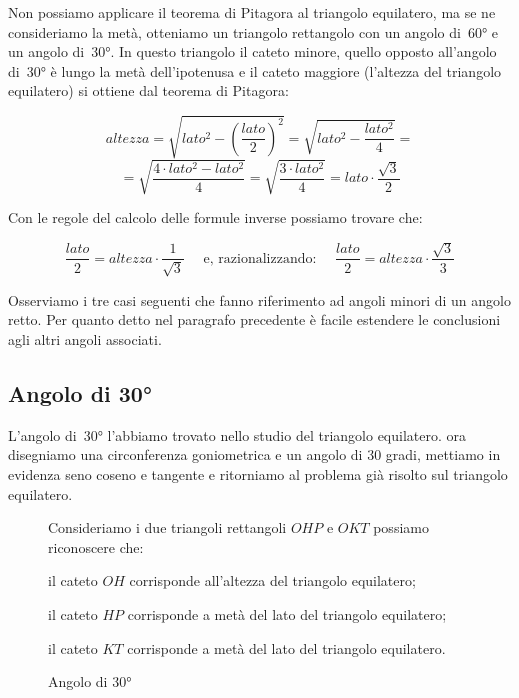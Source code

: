 Non possiamo applicare il teorema di Pitagora al triangolo equilatero, 
ma se ne consideriamo la metà, otteniamo un triangolo rettangolo con un angolo 
di~60° e un angolo di~30°. In questo triangolo il cateto minore, quello opposto 
all'angolo di~30° è lungo la metà dell'ipotenusa e il cateto maggiore 
(l'altezza del triangolo equilatero) si ottiene dal teorema di Pitagora:

\[altezza = \sqrt{lato^2 - \left (\frac{lato}{2} \right )^2} = 
            \sqrt{lato^2 - \frac{lato^2}{4}}= \]
\[          =\sqrt{\frac{4 \cdot lato^2 - lato^2}{4}}=
            \sqrt{\frac{3 \cdot lato^2}{4}}=
            lato \cdot \frac{\sqrt{3}}{2} \]

Con le regole del calcolo delle formule inverse possiamo trovare che:

\[\frac{lato}{2} = altezza \cdot \frac{1}{\sqrt{3}} \quad 
\text{ e, razionalizzando: } \quad 
  \frac{lato}{2} = altezza \cdot \frac{\sqrt{3}}{3}\]

Osserviamo i tre casi seguenti che fanno riferimento ad angoli minori di un
angolo retto. Per quanto detto nel paragrafo precedente è facile estendere le
conclusioni agli altri angoli associati.

\subsection{Angolo di 30°}

L'angolo di~30° l'abbiamo trovato nello studio del triangolo equilatero. ora 
disegniamo una circonferenza goniometrica e un angolo di 30 gradi, mettiamo in 
evidenza seno coseno e tangente e ritorniamo al problema già risolto sul 
triangolo equilatero.

 \begin{figure}[!h]
 \begin{minipage}{.45\textwidth}
  \begin{center}
\begin{inaccessibleblock}
    
    \caption{Angolo di 30°}
    \label{fig:trigo_angolo_30}
\end{inaccessibleblock}
  \end{center}
 \end{minipage}
 \begin{minipage}{.45\textwidth}
Consideriamo i due triangoli rettangoli $OHP$ e $OKT$ possiamo riconoscere che:
\begin{itemize*}
 \item il cateto $OH$ corrisponde all'altezza del triangolo equilatero; 
 \item il cateto $HP$ corrisponde a metà del lato del triangolo equilatero;
 \item il cateto $KT$ corrisponde a metà del lato del triangolo equilatero.
\end{itemize*}
 \end{minipage}
\end{figure}
\vspace{-12pt}

